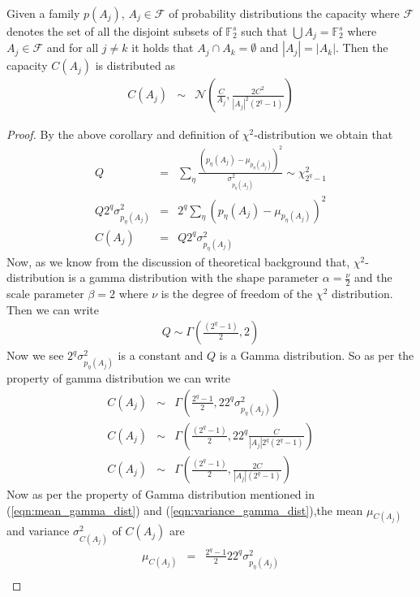 \begin{theorem}
Given a family $p(A_j)$, $A_j \in \mathcal{F}$ of probability distributions the capacity where $\mathcal{F}$ denotes the set of all the disjoint subsets of $\mathbb{F}_{2}^{s}$ such that $\bigcup A_j = \mathbb{F}_{2}^{s}$ where $A_j \in \mathcal{F}$ and for all $j \neq k$ it holds that $A_j \cap A_k = \emptyset$ and $|A_j|=|A_k|$. Then the capacity $C(A_j)$ is distributed as 
\begin{eqnarray*}
C(A_j) &\sim & \mathcal{N}\left(\frac{C}{A_j},\frac{2C^2}{|A_j|^2(2^q -1)}\right)
\end{eqnarray*}
\end{theorem}
\begin{proof}
By the above corollary and definition of $\chi^2$-distribution we obtain that
\begin{eqnarray*}
Q &=& \displaystyle\sum_{\eta}\frac{\left(p_{\eta}(A_j) - \mu_{p_{\eta}(A_j)}\right)^2}{\sigma_{p_{\eta}(A_j)}^2} \sim \chi^{2}_{2^q-1}\\
Q2^q\sigma_{p_{\eta}(A_j)}^2 &=& 2^q\displaystyle\sum_{\eta}\left(p_{\eta}(A_j) - \mu_{p_{\eta}(A_j)}\right)^2\\
C(A_j) &=& Q2^q\sigma_{p_{\eta}(A_j)}^2
\end{eqnarray*}
Now, as we know from the discussion of theoretical background that, $\chi^2$-distribution is a gamma distribution with the shape parameter $\alpha = \frac{\nu}{2}$ and the scale parameter $\beta = 2$ where $\nu$ is the degree of freedom of the $\chi^2$ distribution. Then we can write
\begin{eqnarray*}
Q \sim \Gamma\left(\frac{\left(2^q-1\right)}{2},2\right)
\end{eqnarray*}Now we see $2^q\sigma_{p_{\eta}(A_j)}^2$ is a constant and $Q$ is a Gamma distribution. So as per the property of gamma distribution we can write
\begin{eqnarray*}
C(A_j) &\sim & \Gamma\left(\frac{2^q-1}{2},22^q\sigma_{p_{\eta}(A_j)}^2\right)\\
C(A_j) &\sim & \Gamma\left(\frac{(2^q-1)}{2},22^q\frac{C}{|A_j|2^q(2^q-1)}\right)\\
C(A_j) &\sim & \Gamma\left(\frac{(2^q-1)}{2},\frac{2C}{|A_j|(2^q-1)}\right)
\end{eqnarray*}
Now as per the property of Gamma distribution mentioned in (\ref{eqn:mean_gamma_dist}) and (\ref{eqn:variance_gamma_dist}),the mean $\mu_{C(A_j)}$ and variance $\sigma_{C(A_j)}^2$ of $C(A_j)$ are
\begin{eqnarray*}
\mu_{C(A_j)} &=& \frac{2^q-1}{2}22^q\sigma_{p_{\eta}(A_j)}^2\\

\end{eqnarray*}
\end{proof}
